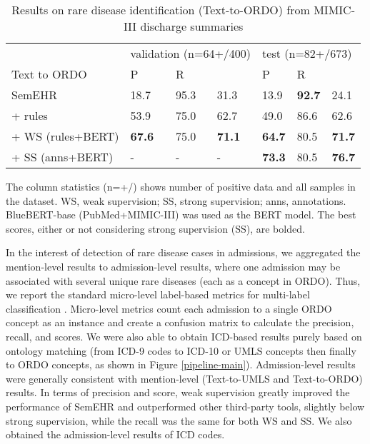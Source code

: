\documentclass[twocolumn]{bmcart}
\begin{document}
\begin{table}[t]
\caption{Results on rare disease identification (Text-to-ORDO) from MIMIC-III discharge summaries}
\scriptsize
\center
\label{mention_rd_id_results}
\begin{threeparttable}
\begin{tabular}{llll|lll}
\cline{1-7}
                            & \multicolumn{3}{l}{validation (n=64+/400)}         & \multicolumn{3}{l}{test (n=82+/673)}               \\
Text to ORDO      & P             & R              &          & P             & R              &        \\
\cline{1-7}
SemEHR \cite{Wu2018semehr} & 18.7          & 95.3           & 31.3          & 13.9          & \textbf{92.7} & 24.1         \\
+ rules                     & 53.9          & 75.0           & 62.7          & 49.0          & 86.6           & 62.6               \\
+ WS (rules+BERT)           & \textbf{67.6} & 75.0           & \textbf{71.1} & \textbf{64.7} & 80.5           & \textbf{71.7}     \\
\hline\hline
+ SS (anns+BERT)            & -             & -              & -             & \textbf{73.3} & 80.5           & \textbf{76.7}      \\
\cline{1-7}
\end{tabular}
\begin{tablenotes}
\item The column statistics (n=+/) shows number of positive data  and all samples  in the dataset. WS, weak supervision; SS, strong supervision; anns, annotations. BlueBERT-base (PubMed+MIMIC-III) was used as the BERT model. The best scores, either or not considering strong supervision (SS), are bolded.
\end{tablenotes}
\end{threeparttable}
\end{table}

In the interest of detection of rare disease cases in admissions, we aggregated the mention-level results to admission-level results, where one admission may be associated with several unique rare diseases (each as a concept in ORDO). Thus, we report the standard micro-level label-based metrics for multi-label classification \cite{Gibaja2015}. Micro-level metrics count each admission to a single ORDO concept as an instance and create a confusion matrix to calculate the precision, recall, and  scores. We were also able to obtain ICD-based results purely based on ontology matching (from ICD-9 codes to ICD-10 or UMLS concepts then finally to ORDO concepts, as shown in Figure \ref{pipeline-main}). Admission-level results were generally consistent with mention-level (Text-to-UMLS and Text-to-ORDO) results. In terms of precision and  score, weak supervision greatly improved the performance of SemEHR and outperformed other third-party tools, slightly below strong supervision, while the recall was the same for both WS and SS. We also obtained the admission-level results of ICD codes.
\end{document}
